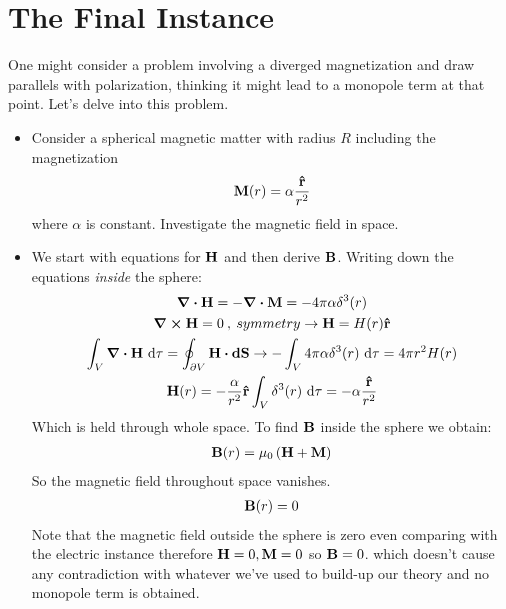 \documentclass{article}
\numberwithin{equation}{section}
\begin{document}
\section{The Final Instance}\label{section:5}
One might consider a problem involving a diverged magnetization and draw parallels with polarization, thinking it might lead to a monopole term at that point. Let's delve into this problem.
\begin{itemize}
\item Consider a spherical magnetic matter with radius $R$ including the magnetization
\begin{equation}
\vb{M}(r)=\alpha \frac{\vu{r}}{r^2}\nonumber
\end{equation}
where $\alpha$ is constant. Investigate the magnetic field in space.
\item We start with equations for $\vb{H}$ and then derive $\vb{B}$. Writing down the equations \textit{inside} the sphere:
\begin{gather}
\div\vb{H}=-\div\vb{M}=-4\pi\alpha\delta^3(r)\nonumber\\\curl\vb{H}=0\:,\: symmetry\rightarrow \vb{H}=H(r)\vu{r}\nonumber\\\int_V\div\vb{H}\ \dd\tau=\oint_{\partial V} \vb{H} \vdot \vb{dS}\rightarrow-\int_V 4\pi\alpha \delta^3(r) \ \dd\tau=4\pi r^2 H(r)\nonumber\\\vb{H}(r)=-\frac{\alpha}{r^2} \vu{r} \int_V\delta^3(r)\ \dd\tau=-\alpha\frac{\vu{r}}{r^2}\nonumber
\end{gather}
Which is held through whole space. To find $\vb{B}$ inside the sphere we obtain:
\begin{gather}
\vb{B}(r)=\mu_0\left( \vb{H}+\vb{M}\right)\nonumber
\end{gather}
So the magnetic field throughout space vanishes.
\begin{gather}
\vb{B}(r)=0\nonumber
\end{gather}
Note that the magnetic field outside the sphere is zero even comparing with the electric instance therefore $\vb{H}=0 , \vb{M}=0$ so $\vb{B}=0$. which doesn't cause any contradiction with whatever we've used to  build-up our theory and no monopole term is obtained.
\end{itemize}
\end{document}
